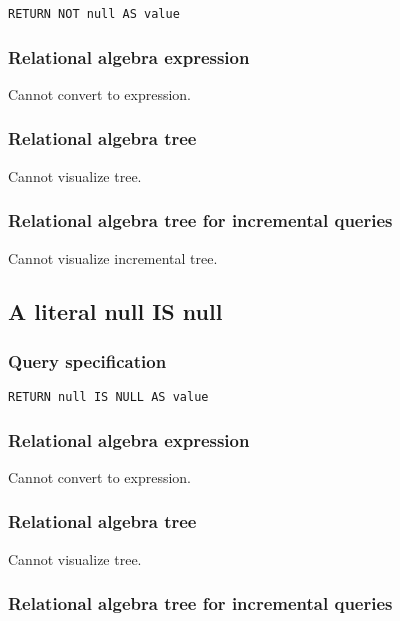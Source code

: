\begin{lstlisting}
RETURN NOT null AS value
\end{lstlisting}

\subsubsection*{Relational algebra expression}

Cannot convert to expression.

\subsubsection*{Relational algebra tree}

Cannot visualize tree.

\subsubsection*{Relational algebra tree for incremental queries}

Cannot visualize incremental tree.

\subsection{A literal null IS null}

\subsubsection*{Query specification}

\begin{lstlisting}
RETURN null IS NULL AS value
\end{lstlisting}

\subsubsection*{Relational algebra expression}

Cannot convert to expression.

\subsubsection*{Relational algebra tree}

Cannot visualize tree.

\subsubsection*{Relational algebra tree for incremental queries}

